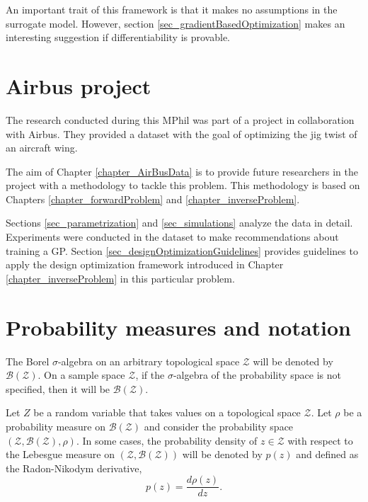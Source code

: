 An important trait of this framework is that it makes no assumptions in the surrogate model.
However, section \ref{sec_gradientBasedOptimization} makes an interesting suggestion if differentiability is provable.

\section{Airbus project}

The research conducted during this MPhil was part of a project in collaboration with Airbus.
They provided a dataset with the goal of optimizing the jig twist of an aircraft wing.

The aim of Chapter \ref{chapter_AirBusData} is to provide future researchers in the project with a methodology to tackle this problem.
This methodology is based on Chapters \ref{chapter_forwardProblem} and \ref{chapter_inverseProblem}.

Sections \ref{sec_parametrization} and \ref{sec_simulations} analyze the data in detail. 
Experiments were conducted in the dataset to make recommendations about training a GP.
Section \ref{sec_designOptimizationGuidelines} provides guidelines to apply the design optimization framework introduced in Chapter \ref{chapter_inverseProblem} in this particular problem.

\section{Probability measures and notation} \label{sec_probMeasuresNotation}

The Borel $\sigma$-algebra on an arbitrary topological space $\mathcal{Z}$ will be denoted by $\mathcal{B}(\mathcal{Z})$. On a sample space $\mathcal{Z}$, if the $\sigma$-algebra of the probability space is not specified, then it will be $\mathcal{B}(\mathcal{Z})$.

Let $Z$ be a random variable that takes values on a topological space $\mathcal{Z}$. Let $\rho$ be a probability measure on $\mathcal{B}(\mathcal{Z})$ and consider the probability space $(\mathcal{Z},\mathcal{B}(\mathcal{Z}),\rho)$. In some cases, the probability density of $z \in \mathcal{Z}$ with respect to the Lebesgue measure on $(\mathcal{Z},\mathcal{B}(\mathcal{Z}))$ will be denoted by $p(z)$ and defined as the Radon-Nikodym derivative,
\begin{equation*}
  p(z) = \frac{d\rho(z)}{dz}.
\end{equation*}


